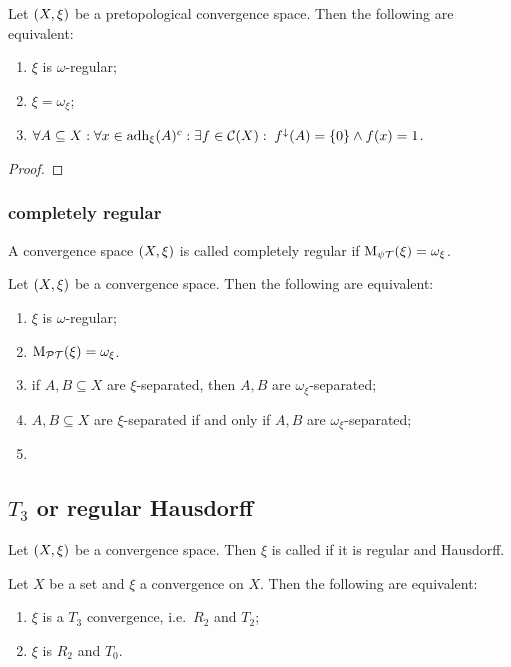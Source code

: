 \begin{proposition}
Let $\sSet{X,\xi}$ be a pretopological convergence space. Then the following are equivalent:
\begin{enumerate}
\item $\xi$ is $\omega$-regular;
\item $\xi = \omega_\xi$;
\item $\forall A\subseteq X: \forall x\in \operatorname{adh}_\xi(A)^c: \exists f\in \operatorname{\mathcal{C}}(X): \; f^{\downarrow}(A) = \{0\} \land f(x) = 1$.
\end{enumerate}
\end{proposition}
\begin{proof}

\end{proof}


\subsubsection{completely regular}
\begin{definition}
A convergence space $\sSet{X,\xi}$ is called completely regular if $\operatorname{M_{\psi\mathcal{T}}}(\xi) = \omega_\xi$.
\end{definition}

\begin{proposition}
Let $\sSet{X,\xi}$ be a convergence space. Then the following are equivalent:
\begin{enumerate}
\item $\xi$ is $\omega$-regular;
\item $\operatorname{M_\mathcal{PT}}(\xi) = \omega_\xi$.
\item if $A,B\subseteq X$ are $\xi$-separated, then $A,B$ are $\omega_\xi$-separated;
\item $A,B\subseteq X$ are $\xi$-separated \textup{if and only if} $A,B$ are $\omega_\xi$-separated;
\item 
\end{enumerate}
\end{proposition}

\subsection{$T_3$ or regular Hausdorff}
\begin{definition}
Let $\sSet{X,\xi}$ be a convergence space. Then $\xi$ is called  if it is regular and Hausdorff.
\end{definition}

\begin{proposition}
Let $X$ be a set and $\xi$ a convergence on $X$. Then the following are equivalent:
\begin{enumerate}
\item $\xi$ is a $T_3$ convergence, i.e.\ $R_2$ and $T_2$;
\item $\xi$ is $R_2$ and $T_0$.
\end{enumerate}
\end{proposition}

